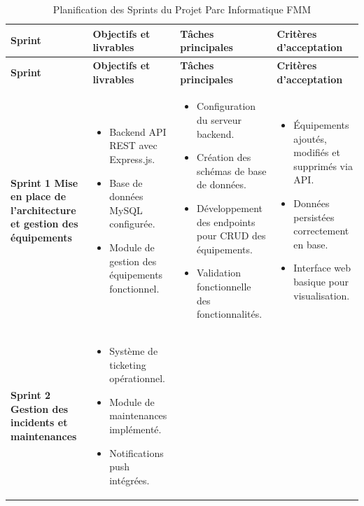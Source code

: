 \begin{longtable}{|p{3cm}|p{4cm}|p{4cm}|p{4cm}|}
\caption{Planification des Sprints du Projet Parc Informatique FMM}\label{tab:sprints} \\
\hline
\textbf{Sprint} & \textbf{Objectifs et livrables} & \textbf{Tâches principales} & \textbf{Critères d’acceptation}  \\
\hline
\endfirsthead
\hline
\textbf{Sprint} & \textbf{Objectifs et livrables} & \textbf{Tâches principales} & \textbf{Critères d’acceptation}  \\
\hline
\endhead
\textbf{Sprint 1 \newline Mise en place de l'architecture et gestion des équipements} &
\begin{itemize}[leftmargin=4pt]
    \item Backend API REST avec Express.js.
    \item Base de données MySQL configurée.
    \item Module de gestion des équipements fonctionnel.
\end{itemize} &
\begin{itemize}[leftmargin=4pt]
    \item Configuration du serveur backend.
    \item Création des schémas de base de données.
    \item Développement des endpoints pour CRUD des équipements.
    \item Validation fonctionnelle des fonctionnalités.
\end{itemize} &
\begin{itemize}[leftmargin=4pt]
    \item Équipements ajoutés, modifiés et supprimés via API.
    \item Données persistées correctement en base.
    \item Interface web basique pour visualisation.
\end{itemize}  \\
\hline
\textbf{Sprint 2 \newline Gestion des incidents et maintenances} &
\begin{itemize}[leftmargin=4pt]
    \item Système de ticketing opérationnel.
    \item Module de maintenances implémenté.
    \item Notifications push intégrées.
\end{itemize} &
\begin{itemize}[leftmargin=4pt]

\end{itemize}
\end{longtable}
